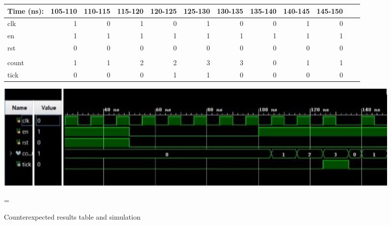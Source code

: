 \documentclass[11pt]{article}
\begin{document}
\begin{figure}[ht]\centering
	\begin{tabular}{l|rrrrrrrrrrr}
		Time (ns): & 105-110 & 110-115 & 115-120 & 120-125 & 125-130 &130-135 & 135-140 & 140-145 & 145-150 \\
		\midrule 
		clk& 1 &0  & 1 & 0 & 1 &0 & 0 & 1 & 0  \\
		en& 1 &1  & 1 & 1 & 1 &1 & 1 & 1 &1  \\
		rst& 0 &0  & 0 & 0 & 0 &0 & 0 & 0 & 0 \\ \\
		count& 1& 1 &2 & 2 & 3 & 3 &0 & 1 & 1  \\
		tick & 0 &0  & 0 & 1& 1 &0 & 0 & 0&0 \\
		
	\end{tabular}\medskip
	
	
	\includegraphics[width=1.0\textwidth]{Counter}
	\caption{Counterexpected results table and simulation}
	\label{fig:sim_with_table}=
	
\end{figure}

\clearpage
\end{document}
